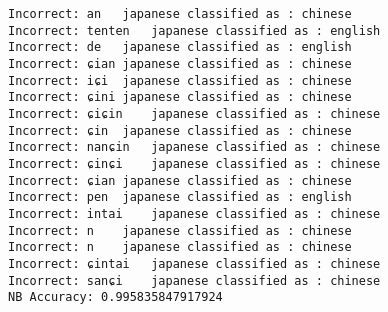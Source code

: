 \documentclass[a4paper]{article}
\begin{document}
\begin{verbatim}
Incorrect: an	japanese classified as : chinese
Incorrect: tenten	japanese classified as : english
Incorrect: de	japanese classified as : english
Incorrect: ɕian	japanese classified as : chinese
Incorrect: iɕi	japanese classified as : chinese
Incorrect: ɕini	japanese classified as : chinese
Incorrect: ɕiɕin	japanese classified as : chinese
Incorrect: ɕin	japanese classified as : chinese
Incorrect: nanɕin	japanese classified as : chinese
Incorrect: ɕinɕi	japanese classified as : chinese
Incorrect: ɕian	japanese classified as : chinese
Incorrect: pen	japanese classified as : english
Incorrect: intai	japanese classified as : chinese
Incorrect: n	japanese classified as : chinese
Incorrect: n	japanese classified as : chinese
Incorrect: ɕintai	japanese classified as : chinese
Incorrect: sanɕi	japanese classified as : chinese
NB Accuracy: 0.995835847917924


\end{verbatim}
\end{document}
